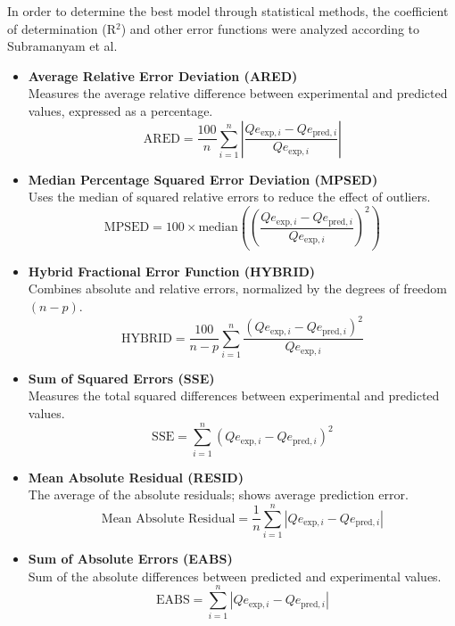 \documentclass[journal=jacsat,manuscript=article]{achemso}
\begin{document}
In order to determine the best model through statistical methods, the coefficient of determination (R$^2$) and other error functions were analyzed according to Subramanyam et al\cite{Subramanyam2014}.
\begin{itemize}

\item \textbf{ Average Relative Error Deviation (ARED)}  
\\ Measures the average relative difference between experimental and predicted values, expressed as a percentage.
\[
\text{ARED} = \frac{100}{n} \sum_{i=1}^{n} \left| \frac{Qe_{\text{exp},i} - Qe_{\text{pred},i}}{Qe_{\text{exp},i}} \right|
\]

\item \textbf{ Median Percentage Squared Error Deviation (MPSED)}  
\\ Uses the median of squared relative errors to reduce the effect of outliers.
\[
\text{MPSED} = 100 \times \text{median} \left( \left( \frac{Qe_{\text{exp},i} - Qe_{\text{pred},i}}{Qe_{\text{exp},i}} \right)^2 \right)
\]

\item \textbf{ Hybrid Fractional Error Function (HYBRID)}  
\\ Combines absolute and relative errors, normalized by the degrees of freedom $(n - p)$.
\[
\text{HYBRID} = \frac{100}{n - p} \sum_{i=1}^{n} \frac{(Qe_{\text{exp},i} - Qe_{\text{pred},i})^2}{Qe_{\text{exp},i}}
\]

\item \textbf{ Sum of Squared Errors (SSE)}  
\\ Measures the total squared differences between experimental and predicted values.
\[
\text{SSE} = \sum_{i=1}^{n} \left( Qe_{\text{exp},i} - Qe_{\text{pred},i} \right)^2
\]

\item \textbf{Mean Absolute Residual (RESID)}  
\\ The average of the absolute residuals; shows average prediction error.
\[
\text{Mean Absolute Residual} = \frac{1}{n} \sum_{i=1}^{n} \left| Qe_{\text{exp},i} - Qe_{\text{pred},i} \right|
\]

\item \textbf{ Sum of Absolute Errors (EABS)}  
\\ Sum of the absolute differences between predicted and experimental values.
\[
\text{EABS} = \sum_{i=1}^{n} \left| Qe_{\text{exp},i} - Qe_{\text{pred},i} \right|
\]

\end{itemize}
\end{document}
